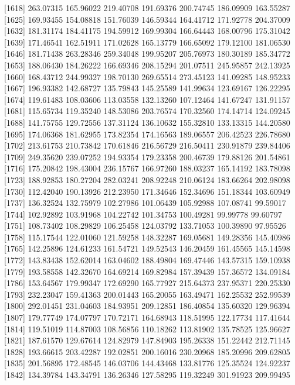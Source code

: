 \documentclass[
  10pt,
  a4paper,oneside]{article}
\begin{document}
{[}1618{]} 263.07315 165.96022 219.40708 191.69376 200.74745 186.09909 163.55287
{[}1625{]} 169.93455 154.08818 151.76039 146.59344 164.41712 171.92778 204.37009
{[}1632{]} 181.31174 184.41175 194.59912 169.99304 166.64443 168.00796 175.31042
{[}1639{]} 171.46541 162.51911 171.02628 165.13779 166.65092 179.12100 181.06530
{[}1646{]} 181.71438 263.28346 259.34048 199.95207 205.76973 180.30189 185.34772
{[}1653{]} 188.06430 184.26222 166.69346 208.15294 201.07511 245.95857 242.13925
{[}1660{]} 168.43712 244.99327 198.70130 269.65514 273.45123 141.09285 148.95233
{[}1667{]} 196.93382 142.68727 135.79843 145.25589 141.99634 123.69167 126.22295
{[}1674{]} 119.61483 108.03606 113.03558 132.13260 107.12464 141.67247 131.91157
{[}1681{]} 115.65734 119.35240 148.53086 203.76574 170.32560 174.14714 124.09245
{[}1688{]} 141.75755 129.72556 137.31124 136.10632 155.32810 133.13315 144.20580
{[}1695{]} 174.06368 181.62955 173.82354 174.16563 189.06557 206.42523 226.78680
{[}1702{]} 213.61753 210.73842 170.61846 216.56729 216.50411 230.91879 239.84406
{[}1709{]} 249.35620 239.07252 194.93354 179.23358 200.46739 179.88126 201.54861
{[}1716{]} 175.20842 198.43004 236.15767 166.97260 188.03237 165.14192 183.78098
{[}1723{]} 188.92853 180.27204 282.03241 208.92248 210.06124 183.66264 202.98098
{[}1730{]} 112.42040 190.13926 212.23950 171.34646 152.34696 151.18344 103.60949
{[}1737{]} 136.32524 132.75979 102.27986 101.06439 105.92988 107.08741 99.59017
{[}1744{]} 102.92892 103.91968 104.22742 101.34753 100.49281 99.99778 99.60797
{[}1751{]} 108.73402 108.29829 106.25458 124.03792 133.71053 100.39890 97.95526
{[}1758{]} 115.17544 122.01060 121.59258 148.32287 169.05681 149.28356 145.40986
{[}1765{]} 142.25896 124.61233 161.54721 149.52543 146.20459 161.45565 145.14598
{[}1772{]} 143.83438 152.62014 163.04602 188.49804 169.47446 143.57315 159.10938
{[}1779{]} 193.58558 142.32670 164.69214 169.82984 157.39439 157.36572 134.09184
{[}1786{]} 153.64567 179.99347 172.69290 165.77927 215.64373 237.95371 220.25330
{[}1793{]} 232.23047 159.41363 200.01443 165.20055 163.49471 162.25532 252.99539
{[}1800{]} 292.01451 231.04603 184.93951 209.12851 186.40854 135.60320 129.96394
{[}1807{]} 179.77749 174.07797 170.72171 164.68943 118.51995 122.17734 117.41644
{[}1814{]} 119.51019 114.87003 108.56856 110.18262 113.81902 135.78525 125.96627
{[}1821{]} 187.61570 129.67614 124.82979 147.84903 195.26338 151.22442 212.71145
{[}1828{]} 193.66615 203.42287 192.02851 200.16016 230.20968 185.20996 209.62805
{[}1835{]} 201.56895 172.48545 146.03706 144.43468 133.81776 125.35524 124.92237
{[}1842{]} 134.39784 143.34791 136.26346 127.58295 119.32249 301.91923 209.99495
\end{document}
